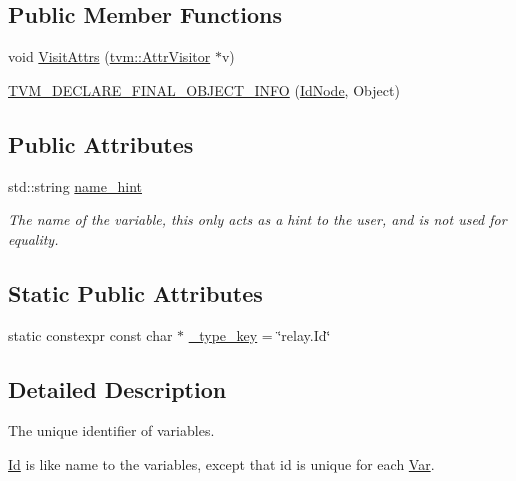 \subsection*{Public Member Functions}
\begin{DoxyCompactItemize}
\item 
void \hyperlink{classtvm_1_1relay_1_1IdNode_a8e7864342454e34c9185c78963f4513d}{Visit\+Attrs} (\hyperlink{classtvm_1_1AttrVisitor}{tvm\+::\+Attr\+Visitor} $\ast$v)
\item 
\hyperlink{classtvm_1_1relay_1_1IdNode_abe9a43d6956527a5b170cb377c5e4ac2}{T\+V\+M\+\_\+\+D\+E\+C\+L\+A\+R\+E\+\_\+\+F\+I\+N\+A\+L\+\_\+\+O\+B\+J\+E\+C\+T\+\_\+\+I\+N\+FO} (\hyperlink{classtvm_1_1relay_1_1IdNode}{Id\+Node}, Object)
\end{DoxyCompactItemize}
\subsection*{Public Attributes}
\begin{DoxyCompactItemize}
\item 
std\+::string \hyperlink{classtvm_1_1relay_1_1IdNode_ae52f93185d084c36b2fe99b1aa512909}{name\+\_\+hint}
\begin{DoxyCompactList}\small\item\em The name of the variable, this only acts as a hint to the user, and is not used for equality. \end{DoxyCompactList}\end{DoxyCompactItemize}
\subsection*{Static Public Attributes}
\begin{DoxyCompactItemize}
\item 
static constexpr const char $\ast$ \hyperlink{classtvm_1_1relay_1_1IdNode_a1dc655dcc84c2309ce4f461d98d702ec}{\+\_\+type\+\_\+key} = \char`\"{}relay.\+Id\char`\"{}
\end{DoxyCompactItemize}


\subsection{Detailed Description}
The unique identifier of variables. 

\hyperlink{classtvm_1_1relay_1_1Id}{Id} is like name to the variables, except that id is unique for each \hyperlink{classtvm_1_1relay_1_1Var}{Var}.

